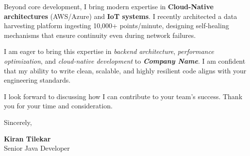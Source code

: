 \documentclass[10pt,a4paper]{article}
\begin{document}
Beyond core development, I bring modern expertise in \textbf{Cloud-Native architectures} (AWS/Azure) and \textbf{IoT systems}. I recently architected a data harvesting platform ingesting 10,000+ points/minute, designing self-healing mechanisms that ensure continuity even during network failures.

I am eager to bring this expertise in \textit{backend architecture}, \textit{performance optimization}, and \textit{cloud-native development} to \textbf{\textit{Company Name}}. I am confident that my ability to write clean, scalable, and highly resilient code aligns with your engineering standards.

I look forward to discussing how I can contribute to your team's success. Thank you for your time and consideration.

\vspace{0.6cm}

\noindent Sincerely,

\vspace{0.6cm}

\noindent\textbf{Kiran Tilekar}\\
{\small Senior Java Developer}
\end{document}
